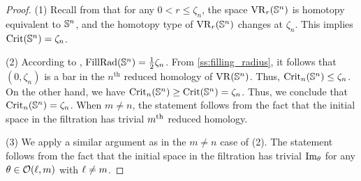 \begin{proof}
	(1) Recall from \cite[Thm.~7.1]{lim2020vietoris} that for any $0 < r \leq \zeta_n$, the space $\operatorname{VR}_r(\mathbb{S}^n)$ is homotopy equivalent to $\mathbb{S}^n$, and the homotopy type of $\operatorname{VR}_r(\mathbb{S}^n)$ changes at $\zeta_n$.
	This implies $\operatorname{Crit}(\mathbb{S}^n)=\zeta_n$.

	(2) According to \cite{katz1983filling}, \(\mathrm{FillRad}(\mathbb{S}^n) = \frac{1}{2}\zeta_n\).
	From \cref{ss:filling_radius}, it follows that \((0, \zeta_n)\) is a bar in the \(n^{\text{th}}\) reduced homology of \(\operatorname{VR} (\mathbb{S}^n)\).
	Thus, \(\operatorname{Crit}_n(\mathbb{S}^n) \leq \zeta_n\).
	On the other hand, we have \(\operatorname{Crit}_n(\mathbb{S}^n) \geq \operatorname{Crit}(\mathbb{S}^n) = \zeta_n\).
    Thus, we conclude that \(\operatorname{Crit}_n(\mathbb{S}^n) = \zeta_n\).
    When $m\neq n$, the statement follows from the fact that the initial space in the filtration has trivial $m^{\mathrm{th}}$ reduced homology.

	(3) We apply a similar argument as in the $m\neq n$ case of (2). The statement follows from the fact that the initial space in the filtration has trivial $\operatorname{Im}_\theta$ for any \(\theta \in \mathcal{O}(\ell,m)\) with \(\ell \neq m\). 
\end{proof}

\subsubsection{}\label{ss:VRSn projection}

